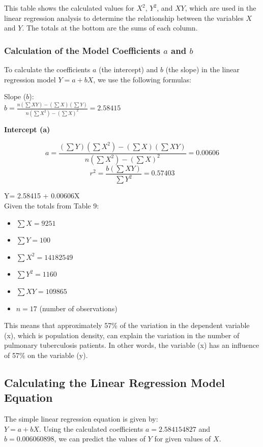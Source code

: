 \documentclass[conference]{IEEEtran}
\begin{document}
This table shows the calculated values for $X^2$, $Y^2$, and $XY$, which are used in the linear regression analysis to determine the relationship between the variables $X$ and $Y$. The totals at the bottom are the sums of each column.

\subsubsection{Calculation of the Model Coefficients $a$ and $b$}

To calculate the coefficients $a$ (the intercept) and $b$ (the slope) in the linear regression model $Y=a+bX$, we use the following formulas:

Slope ($b$):\\



    $b = \frac{n \left( \sum XY \right) - \left( \sum X \right) \left( \sum Y \right)}{n \left( \sum X^2 \right) - \left( \sum X \right)^2} = 2.58415$

    \textbf{Intercept (a)}

$$a = \frac{\left( \sum Y \right) \left( \sum X^2 \right) - \left( \sum X \right) \left( \sum XY \right)}{n \left( \sum X^2 \right) - \left( \sum X \right)^2}= 0.00606$$
$$r^2 = \frac{b \left( \sum XY \right)}{\sum Y^2} = 0.57403$$

Y= 2.58415 + 0.00606X\\
Given the totals from Table 9:
\begin{itemize}
    \item $\sum X = 9251$
    \item $\sum Y = 100$
    \item $\sum X^2 = 14182549$
    \item $\sum Y^2 = 1160$
    \item $\sum XY = 109865$
    \item $n = 17$ (number of observations)
\end{itemize}

This means that approximately 57\% of the variation in the dependent variable (x), which is population density, can explain the variation in the number of pulmonary tuberculosis patients. In other words, the variable (x) has an influence of 57\% on the variable (y).

\subsection{Calculating the Linear Regression Model Equation}
The simple linear regression equation is given by: \\ $Y=a+bX$. Using the calculated coefficients $a=2.584154827$ and $b=0.006060898$, we can predict the values of $Y$ for given values of $X$.
\end{document}

